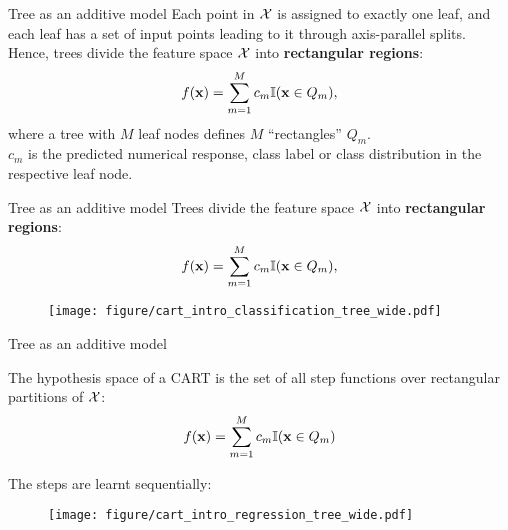 \documentclass[11pt,compress,t,notes=noshow, xcolor=table]{beamer}
\begin{document}
\begin{vbframe}{Tree as an additive model}
Each point in $\mathcal{X}$ is assigned to exactly one leaf, and each leaf has a set of input points leading to it through axis-parallel splits.\\
Hence, trees divide the feature space $\mathcal{X}$ into \textbf{rectangular regions}: 
  \begin{align*}
    f(\mathbf{x}) = \sum_{m=1}^M c_m \mathbb{I}(\mathbf{x} \in Q_m),
  \end{align*}
  where a tree with $M$ leaf nodes defines $M$ \enquote{rectangles} $Q_m$.\\
  $c_m$ is the predicted numerical response, class label or class
  distribution in the respective leaf node.

\end{vbframe}

\begin{vbframe}{Tree as an additive model}
Trees divide the feature space $\mathcal{X}$ into \textbf{rectangular regions}: 
  \begin{align*}
    f(\mathbf{x}) = \sum_{m=1}^M c_m \mathbb{I}(\mathbf{x} \in Q_m),
  \end{align*}


\color{fgcolor}

\begin{figure}
\texttt{[image: figure/cart\_intro\_classification\_tree\_wide.pdf]}
\end{figure}
\end{vbframe}

\begin{vbframe}{Tree as an additive model}

The hypothesis space of a CART is the set of all step functions over rectangular partitions of $\mathcal{X}$:
\begin{align*}
    f(\mathbf{x}) = \sum_{m=1}^M c_m \mathbb{I}(\mathbf{x} \in Q_m)
\end{align*}

The steps are learnt sequentially:


\begin{figure} 
\texttt{[image: figure/cart\_intro\_regression\_tree\_wide.pdf]}
\end{figure}

\end{vbframe}
\end{document}
